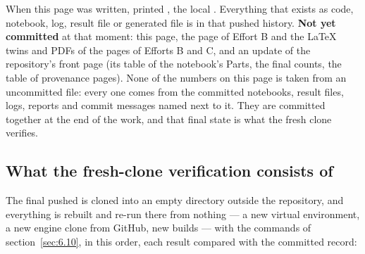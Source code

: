 When this page was written,  printed , the local . Everything that exists as code, notebook, log, result file or generated file is in that pushed history. \textbf{Not yet committed} at that moment: this page, the page of Effort B and the LaTeX twins and PDFs of the pages of Efforts B and C, and an update of the repository's front page (its table of the notebook's Parts, the final counts, the table of provenance pages). None of the numbers on this page is taken from an uncommitted file: every one comes from the committed notebooks, result files, logs, reports and commit messages named next to it. They are committed together at the end of the work, and that final state is what the fresh clone verifies.

\subsection{What the fresh-clone verification consists of}
\label{sec:7.2}

The final pushed  is cloned into an empty directory outside the repository, and everything is rebuilt and re-run there from nothing --- a new virtual environment, a new engine clone from GitHub, new builds --- with the commands of section~\ref{sec:6.10}, in this order, each result compared with the committed record:

